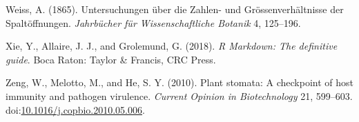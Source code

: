 \documentclass[utf8]{frontiersSCNS}
\begin{document}
\leavevmode\hypertarget{ref-weiss_untersuchungen_1865}{}%
Weiss, A. (1865). Untersuchungen über die Zahlen- und
Grössenverhältnisse der Spaltöffnungen. \emph{Jahrbücher für
Wissenschaftliche Botanik} 4, 125--196.

\leavevmode\hypertarget{ref-xie_r_2018}{}%
Xie, Y., Allaire, J. J., and Grolemund, G. (2018). \emph{R Markdown: The
definitive guide}. Boca Raton: Taylor \& Francis, CRC Press.

\leavevmode\hypertarget{ref-zeng_plant_2010}{}%
Zeng, W., Melotto, M., and He, S. Y. (2010). Plant stomata: A checkpoint
of host immunity and pathogen virulence. \emph{Current Opinion in
Biotechnology} 21, 599--603.
doi:\href{https://doi.org/10.1016/j.copbio.2010.05.006}{10.1016/j.copbio.2010.05.006}.
\end{document}
